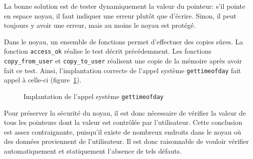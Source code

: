 La bonne solution est de tester dynamiquement la valeur du pointeur: s'il pointe
en espace noyau, il faut indiquer une erreur plutôt que d'écrire. Sinon, il peut
toujours y avoir une erreur, mais au moins le noyau est protégé.

Dans le noyau, un ensemble de fonctions permet d'effectuer des copies sûres. La
fonction \texttt{access\_ok} réalise le test décrit précédemment. Les fonctions
\texttt{copy\_from\_user} et \nolinkurl{copy_to_user} réalisent une copie de la
mémoire après avoir fait ce test. Ainsi, l'implantation correcte de l'appel
système \texttt{gettimeofday} fait appel à celle-ci
(figure~\ref{fig:implem-gettime}).

\begin{figure}[h]
\caption{Implantation de l'appel système \texttt{gettimeofday}}
\label{fig:implem-gettime}
\end{figure}

Pour préserver la sécurité du noyau, il est donc nécessaire de vérifier la
valeur de tous les pointeurs dont la valeur est contrôlée par l'utilisateur.
Cette conclusion est assez contraignante, puisqu'il existe de nombreux endroits
dans le noyau où des données proviennent de l'utilisateur. Il est donc
raisonnable de vouloir vérifier automatiquement et statiquement l'absence de
tels défauts.







